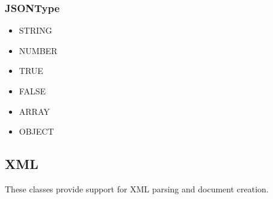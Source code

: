 \documentclass[11pt]{article}
\begin{document}
\subsubsection{JSONType}
 \begin{itemize}
 \item STRING
 \item NUMBER
 \item TRUE
 \item FALSE
 \item ARRAY
 \item OBJECT
\end{itemize}

\subsection{XML}
These classes provide support for XML parsing and document creation.
\end{document}
